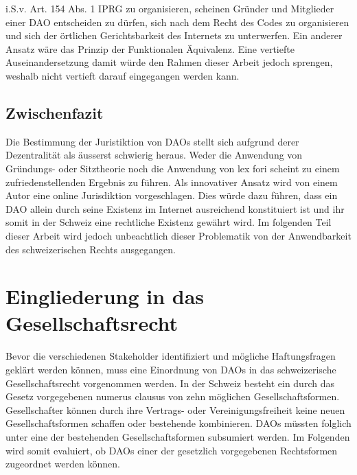 \documentclass[a4paper,12pt]{report}
\begin{document}
i.S.v. Art. 154 Abs. 1 IPRG zu organisieren, scheinen Gründer und Mitglieder einer DAO entscheiden zu dürfen, sich nach dem Recht des Codes zu organisieren und sich der örtlichen Gerichtsbarkeit des Internets zu unterwerfen. Ein anderer Ansatz wäre das Prinzip der Funktionalen Äquivalenz. Eine vertiefte Auseinandersetzung damit würde den Rahmen dieser Arbeit jedoch sprengen, weshalb nicht vertieft darauf eingegangen werden kann. 
	\closesection
	
	\subsection{Zwischenfazit}
	\startsubsection
		Die Bestimmung der Juristiktion von DAOs stellt sich aufgrund derer Dezentralität als äusserst schwierig heraus. Weder die Anwendung von Gründungs- oder Sitztheorie noch die Anwendung von lex fori scheint zu einem zufriedenstellenden Ergebnis zu führen. Als innovativer Ansatz wird von einem Autor eine online Jurisdiktion vorgeschlagen. Dies würde dazu führen, dass ein DAO allein durch seine Existenz im Internet ausreichend konstituiert ist und ihr somit in der Schweiz eine rechtliche Existenz gewährt wird. Im folgenden Teil dieser Arbeit wird jedoch unbeachtlich dieser Problematik von der Anwendbarkeit des schweizerischen Rechts ausgegangen.
	\closesection
    
	\closesection
	
	\section{Eingliederung in das Gesellschaftsrecht}
	\startsection
    Bevor die verschiedenen Stakeholder identifiziert und mögliche Haftungsfragen geklärt werden können, muss eine Einordnung von DAOs in das schweizerische Gesellschaftsrecht vorgenommen werden. In der Schweiz besteht ein durch das Gesetz vorgegebenen numerus clausus von zehn möglichen Gesellschaftsformen. Gesellschafter können durch ihre Vertrags- oder Vereinigungsfreiheit keine neuen Gesellschaftsformen schaffen oder bestehende kombinieren. DAOs müssten folglich unter eine der bestehenden Gesellschaftsformen subsumiert werden. Im Folgenden wird somit evaluiert, ob DAOs einer der gesetzlich vorgegebenen Rechtsformen zugeordnet werden können. 
	
\end{document}
